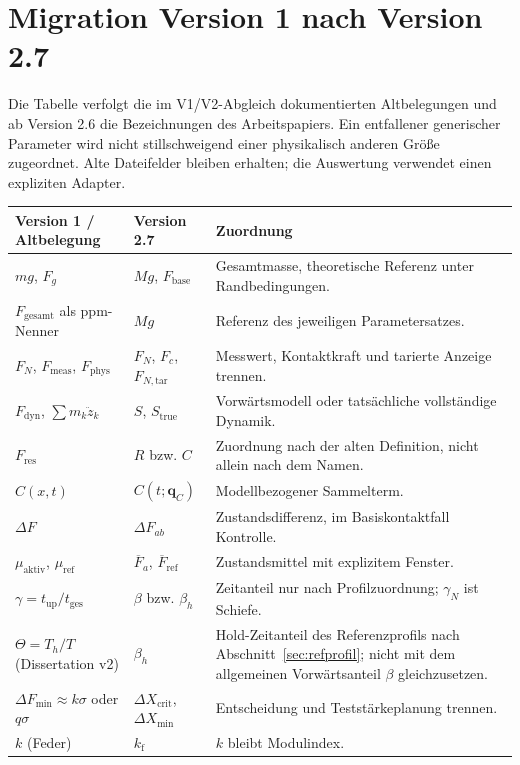 \documentclass[11pt,a4paper]{article}
\begin{document}
\section{Migration Version 1 nach Version 2.7}\label{app:migration}
Die Tabelle verfolgt die im V1/V2-Abgleich dokumentierten Altbelegungen und ab Version 2.6 die Bezeichnungen des Arbeitspapiers. Ein entfallener generischer Parameter wird nicht stillschweigend einer physikalisch anderen Größe zugeordnet. Alte Dateifelder bleiben erhalten; die Auswertung verwendet einen expliziten Adapter.
\begin{longtable}{@{}L{.27\textwidth}L{.28\textwidth}L{.40\textwidth}@{}}
\toprule\textbf{Version 1 / Altbelegung}&\textbf{Version 2.7}&\textbf{Zuordnung}\\\midrule\endhead
$mg$, $F_g$&$Mg$, $F_{\mathrm{base}}$&Gesamtmasse, theoretische Referenz unter Randbedingungen.\\
$F_{\mathrm{gesamt}}$ als ppm-Nenner&$Mg$&Referenz des jeweiligen Parametersatzes.\\
$F_N$, $F_{\mathrm{meas}}$, $F_{\mathrm{phys}}$&$F_N$, $F_c$, $F_{N,\mathrm{tar}}$&Messwert, Kontaktkraft und tarierte Anzeige trennen.\\
$F_{\mathrm{dyn}}$, $\sum m_k\ddot z_k$&$S$, $S_{\mathrm{true}}$&Vorwärtsmodell oder tatsächliche vollständige Dynamik.\\
$F_{\mathrm{res}}$&$R$ bzw. $C$&Zuordnung nach der alten Definition, nicht allein nach dem Namen.\\
$C(x,t)$&$C(t;\mathbf q_C)$&Modellbezogener Sammelterm.\\
$\Delta F$&$\Delta F_{ab}$&Zustandsdifferenz, im Basiskontaktfall Kontrolle.\\
$\mu_{\mathrm{aktiv}}$, $\mu_{\mathrm{ref}}$&$\overline F_a$, $\overline F_{\mathrm{ref}}$&Zustandsmittel mit explizitem Fenster.\\
$\gamma=t_{\mathrm{up}}/t_{\mathrm{ges}}$&$\beta$ bzw. $\beta_h$&Zeitanteil nur nach Profilzuordnung; $\gamma_N$ ist Schiefe.\\
$\Theta=T_h/T$ (Dissertation v2)&$\beta_h$&Hold-Zeitanteil des Referenzprofils nach Abschnitt~\ref{sec:refprofil}; nicht mit dem allgemeinen Vorwärtsanteil $\beta$ gleichzusetzen.\\
$\Delta F_{\min}\approx k\sigma$ oder $q\sigma$&$\Delta X_{\mathrm{crit}}$, $\Delta X_{\min}$&Entscheidung und Teststärkeplanung trennen.\\
$k$ (Feder)&$k_{\mathrm f}$&$k$ bleibt Modulindex.\\

\end{longtable}
\end{document}
